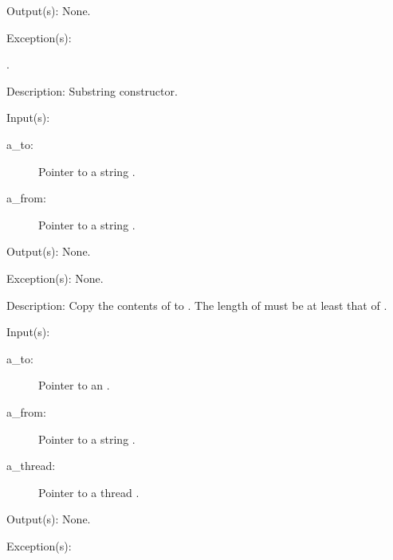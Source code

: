 \begin{capi}
\begin{capilist}
\begin{description}
		\end{description}
	\item[Output(s): ] None.
	\item[Exception(s): ]
		\begin{description}\item[]
		\item[.]
		\end{description}
	\item[Description: ]
		Substring constructor.
	\end{capilist}
\label{nxo_string_copy}
	\begin{capilist}
	\item[Input(s): ]
		\begin{description}\item[]
		\item[a\_to: ]
			Pointer to a string .
		\item[a\_from: ]
			Pointer to a string .
		\end{description}
	\item[Output(s): ] None.
	\item[Exception(s): ] None.
	\item[Description: ]
		Copy the contents of  to .  The length
		of  must be at least that of .
	\end{capilist}
\label{nxo_string_cstring}
	\begin{capilist}
	\item[Input(s): ]
		\begin{description}\item[]
		\item[a\_to: ]
			Pointer to an \classname{nxo}.
		\item[a\_from: ]
			Pointer to a string \classname{nxo}.
		\item[a\_thread: ]
			Pointer to a thread \classname{nxo}.
		\end{description}
	\item[Output(s): ] None.
	\item[Exception(s): ]
		\begin{description}\item[]

\end{description}
\end{capilist}
\end{capi}

